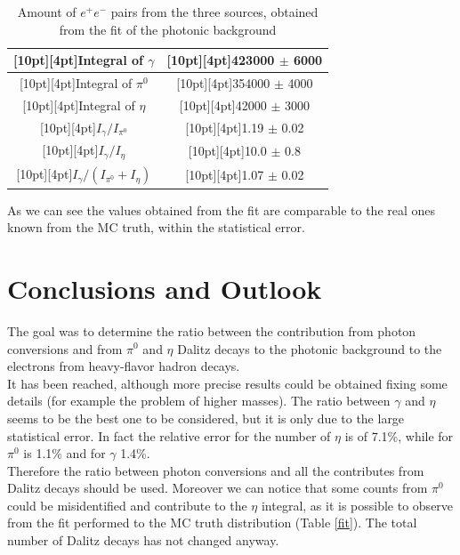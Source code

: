 \documentclass[a4paper,twocolumn,gsifonts,twoside]{gsipaper}
\begin{document}
\begin{table}[htpb]
\center
\caption{Amount of $e^{+}e^{-}$ pairs from the three sources, obtained from the fit of the photonic background}\label{fit2}
\begin{tabular}{|c|c|}
  \hline
  \raisebox{0pt}[10pt][4pt]{Integral of $\gamma$ } &
  \raisebox{0pt}[10pt][4pt]{423000 $\pm$ 6000} \\
  \hline
  \raisebox{0pt}[10pt][4pt]{Integral of $\pi^{0}$ } &
  \raisebox{0pt}[10pt][4pt]{354000 $\pm$ 4000} \\
  \hline
  \raisebox{0pt}[10pt][4pt]{Integral of $\eta$ } &
  \raisebox{0pt}[10pt][4pt]{42000 $\pm$ 3000} \\
  \hline
  \raisebox{0pt}[10pt][4pt]{$I_{\gamma}/I_{\pi^{0}}$} &
  \raisebox{0pt}[10pt][4pt]{1.19 $\pm$ 0.02} \\
  \hline
  \raisebox{0pt}[10pt][4pt]{$I_{\gamma}/I_{\eta}$} &
  \raisebox{0pt}[10pt][4pt]{10.0 $\pm$ 0.8} \\
  \hline
  \raisebox{0pt}[10pt][4pt]{$I_{\gamma}/(I_{\pi^{0}}+I_{\eta})$} &
  \raisebox{0pt}[10pt][4pt]{1.07 $\pm$ 0.02} \\
  \hline
  \end{tabular}
\end{table}

As we can see the values obtained from the fit are comparable to the real ones known from the MC truth, within the statistical error.

\section{Conclusions and Outlook}
The goal was to determine the ratio between the contribution from photon conversions and from $\pi^{0}$ and $\eta$ Dalitz decays 
to the photonic background to the electrons from heavy-flavor hadron decays.\\ 
It has been reached, although more precise results could be obtained fixing some details (for example the problem of higher masses).
The ratio between $\gamma$ and $\eta$ seems to be the best one to be considered, but it is only due to the large statistical error.
In fact the relative error for the number of $\eta$ is of 7.1\%, while for $\pi^{0}$ is 1.1\% and for $\gamma$ 1.4\%.\\ 
Therefore the ratio between photon conversions and all the contributes from Dalitz decays should be used.
Moreover we can notice that some counts from $\pi^{0}$ could be misidentified and contribute to the $\eta$ integral, as it is possible 
to observe from the fit performed to the MC truth distribution (Table \ref{fit}). The total number of Dalitz decays has not changed 
anyway.\\
\end{document}
